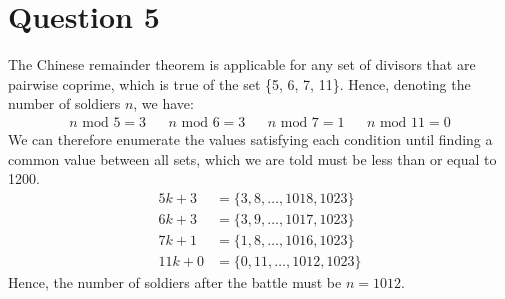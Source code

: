 \section*{Question 5}

The Chinese remainder theorem is applicable for any set of divisors that are pairwise coprime, which is true of the set \{5, 6, 7, 11\}. Hence, denoting the number of soldiers $n$, we have:
\begin{align*}
    n \text{ mod } 5 = 3 && n \text{ mod } 6 = 3 && n \text{ mod } 7 = 1 && n \text{ mod } 11 = 0
\end{align*}
We can therefore enumerate the values satisfying each condition until finding a common value between all sets, which we are told must be less than or equal to 1200.
\begin{align*}
    5k + 3  &= \{3, 8, \dots, 1018, 1023\} \\
    6k + 3  &= \{3, 9, \dots, 1017, 1023\} \\
    7k + 1  &= \{1, 8, \dots, 1016, 1023\} \\
    11k + 0 &= \{0, 11, \dots, 1012, 1023\}
\end{align*}
Hence, the number of soldiers after the battle must be $n=1012$.
